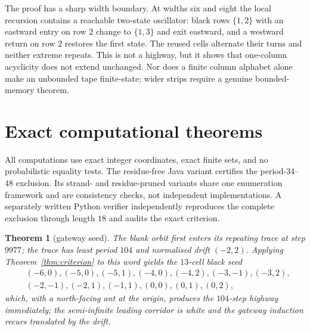 \documentclass[11pt,reqno]{amsart}
\theoremstyle{plain}
\newtheorem{theorem}{Theorem}[section]
\theoremstyle{definition}
\begin{document}
The proof has a sharp width boundary.  At widths six and eight the local recursion
contains a reachable two-state oscillator: black rows $\{1,2\}$ with an eastward
entry on row $2$ change to $\{1,3\}$ and exit eastward, and a westward return on row
$2$ restores the first state.  The reused cells alternate their turns and neither
extreme repeats.  This is not a highway, but it shows that one-column acyclicity does
not extend unchanged.  Nor does a finite column alphabet alone make an unbounded
tape finite-state; wider strips require a genuine bounded-memory theorem.

\section{Exact computational theorems}\label{sec:computation}

All computations use exact integer coordinates, exact finite sets, and no
probabilistic equality tests. The residue-free Java variant certifies the
period-$34$--$48$ exclusion. Its strand- and residue-pruned variants share one
enumeration framework and are consistency checks, not independent
implementations. A separately written Python verifier independently reproduces
the complete exclusion through length $18$ and audits the exact criterion.

\begin{theorem}[gateway seed]\label{thm:gateway}
The blank orbit first enters its repeating trace at step $9977$; the trace has
least period $104$ and normalised drift $(-2,2)$. Applying
Theorem~\ref{thm:criterion} to this word yields the $13$-cell black seed
\[
\begin{aligned}
&(-6,0),(-5,0),(-5,1),(-4,0),(-4,2),(-3,-1),(-3,2),\\
&(-2,-1),(-2,1),(-1,1),(0,0),(0,1),(0,2),
\end{aligned}
\]
which, with a north-facing ant at the origin, produces the $104$-step highway
immediately; the semi-infinite leading corridor is white and the gateway
induction recurs translated by the drift.
\end{theorem}
\end{document}
